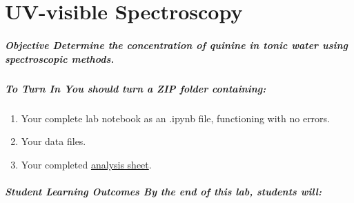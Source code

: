 \documentclass[]{tufte-book}
\providecommand{\tightlist}{%
  \setlength{\itemsep}{0pt}\setlength{\parskip}{0pt}}
\begin{document}
\hypertarget{uv-visible-spectroscopy}{%
\chapter{UV-visible Spectroscopy}\label{uv-visible-spectroscopy}}

\hypertarget{objective-determine-the-concentration-of-quinine-in-tonic-water-using-spectroscopic-methods.}{%
\paragraph{\texorpdfstring{\textbf{Objective} \textbar{} Determine the concentration of quinine in tonic water using spectroscopic methods.}{Objective \textbar{} Determine the concentration of quinine in tonic water using spectroscopic methods.}}\label{objective-determine-the-concentration-of-quinine-in-tonic-water-using-spectroscopic-methods.}}

\hypertarget{to-turn-in-you-should-turn-a-zip-folder-containing}{%
\paragraph{\texorpdfstring{\textbf{To Turn In} \textbar{} You should turn a ZIP folder containing:}{To Turn In \textbar{} You should turn a ZIP folder containing:}}\label{to-turn-in-you-should-turn-a-zip-folder-containing}}

\begin{enumerate}
\def\labelenumi{\arabic{enumi}.}
\tightlist
\item
  Your complete lab notebook as an .ipynb file, functioning with no errors.\\
\item
  Your data files.\\
\item
  Your completed \href{https://github.com/alphonse/alphonse.github.io/raw/master/devel/chem370/assignments/excel-templates/lab1_uv-vis_data-analysis.xlsx}{analysis sheet}.
\end{enumerate}

\hypertarget{student-learning-outcomes-by-the-end-of-this-lab-students-will-1}{%
\paragraph{\texorpdfstring{\textbf{Student Learning Outcomes} \textbar{} \emph{By the end of this lab, students will:}}{Student Learning Outcomes \textbar{} By the end of this lab, students will:}}\label{student-learning-outcomes-by-the-end-of-this-lab-students-will-1}}
\end{document}
